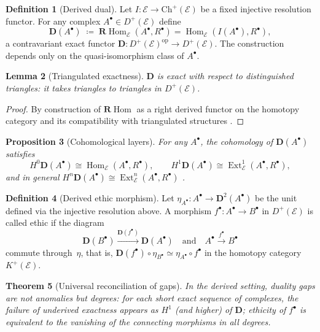 \documentclass[12pt]{article}
\newcommand{\E}{\mathcal{E}}
\newcommand{\Hom}{\operatorname{Hom}}
\newcommand{\Ext}{\operatorname{Ext}}
\newcommand{\RHom}{\mathbf{R}\!\operatorname{Hom}}
\newcommand{\Dplus}{D^{+}}
\theoremstyle{plain}
\newtheorem{theorem}{Theorem}[section]
\newtheorem{lemma}[theorem]{Lemma}
\newtheorem{proposition}[theorem]{Proposition}
\theoremstyle{definition}
\newtheorem{definition}[theorem]{Definition}
\theoremstyle{remark}
\numberwithin{equation}{section}
\begin{document}
\begin{definition}[Derived dual]
Let $I:\E\to\mathrm{Ch}^+(\E)$ be a fixed injective resolution functor.
For any complex $A^\bullet\in D^+(\E)$ define
\[
\mathbf D(A^\bullet)
\;\coloneqq\;
\RHom_\E(A^\bullet,R^\bullet)
=\Hom_\E(I(A^\bullet),R^\bullet),
\]
a contravariant exact functor
$\mathbf D: D^+(\E)^{\mathrm{op}}\to D^+(\E)$.
The construction depends only on the quasi-isomorphism class of $A^\bullet$.
\end{definition}

\begin{lemma}[Triangulated exactness]
\(\mathbf{D}\) is exact with respect to distinguished triangles: it takes triangles to triangles in \(\Dplus(\E)\).
\end{lemma}

\begin{proof}
By construction of \(\RHom\) as a right derived functor on the homotopy category and its compatibility with triangulated structures \cite{Neeman2001}.
\end{proof}

\begin{proposition}[Cohomological layers]
For any \(A^\bullet\), the cohomology of \(\mathbf{D}(A^\bullet)\) satisfies
\[
H^0\mathbf{D}(A^\bullet)\cong \Hom_{\E}(A^\bullet,R^\bullet),\qquad
H^1\mathbf{D}(A^\bullet)\cong \Ext^1_{\E}(A^\bullet,R^\bullet),
\]
and in general \(H^n\mathbf{D}(A^\bullet)\cong \Ext^n_{\E}(A^\bullet,R^\bullet)\) \cite{Weibel1994,GelfandManin2003}.
\end{proposition}

\begin{definition}[Derived ethic morphism]
Let $\eta_{A^\bullet}:A^\bullet\to\mathbf D^2(A^\bullet)$
be the unit defined via the injective resolution above.
A morphism $f^\bullet:A^\bullet\to B^\bullet$
in $D^+(\E)$ is called ethic if the diagram
\[
\mathbf D(B^\bullet)\xrightarrow{\mathbf D(f^\bullet)}\mathbf D(A^\bullet)
\quad\text{and}\quad
A^\bullet\xrightarrow{f^\bullet}B^\bullet
\]
commute through~$\eta$, that is,
\(
\mathbf D(f^\bullet)\circ\eta_{B^\bullet}\simeq\eta_{A^\bullet}\circ f^\bullet
\)
in the homotopy category $K^+(\E)$.
\end{definition}

\begin{theorem}[Universal reconciliation of gaps]\label{thm:universal-gaps}
In the derived setting, duality gaps are not anomalies but degrees: for each short exact sequence of complexes, the failure of underived exactness appears as \(H^1\) (and higher) of \(\mathbf{D}\); ethicity of \(f^\bullet\) is equivalent to the vanishing of the connecting morphisms in all degrees.
\end{theorem}
\end{document}
